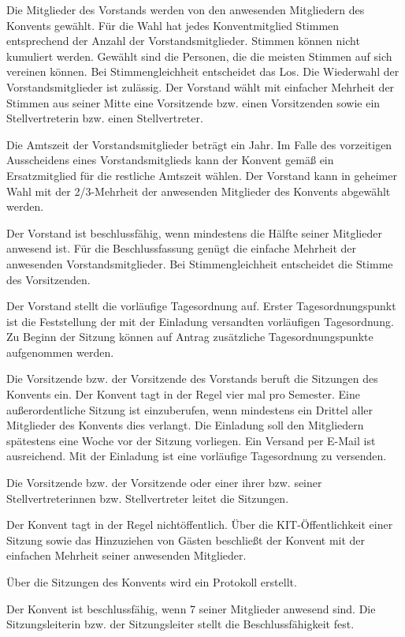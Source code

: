 \documentclass[a4paper, parskip=half, numbers=noenddot]{scrartcl}
\begin{document}
\begin{contract}
\label{wahl}
Die Mitglieder des Vorstands werden von den anwesenden Mitgliedern des Konvents gewählt. Für
die Wahl hat jedes Konventmitglied Stimmen entsprechend der Anzahl der Vorstandsmitglieder. Stimmen können nicht kumuliert werden.
Gewählt sind die Personen, die die meisten Stimmen auf sich vereinen können. Bei Stimmengleichheit entscheidet das Los. Die Wiederwahl der Vorstandsmitglieder ist zulässig.
Der Vorstand wählt mit einfacher Mehrheit der Stimmen aus seiner Mitte eine Vorsitzende bzw.
einen Vorsitzenden sowie ein Stellvertreterin bzw. einen Stellvertreter.

Die Amtszeit der Vorstandsmitglieder beträgt ein Jahr. Im Falle des vorzeitigen Ausscheidens
eines Vorstandsmitglieds kann der Konvent gemäß  ein Ersatzmitglied für die restliche Amtszeit wählen. Der Vorstand kann in geheimer Wahl mit der 2/3-Mehrheit der anwesenden Mitglieder des Konvents abgewählt werden.

Der Vorstand ist beschlussfähig, wenn mindestens die Hälfte seiner Mitglieder anwesend ist. Für die Beschlussfassung genügt die einfache Mehrheit der anwesenden Vorstandsmitglieder. Bei Stimmengleichheit entscheidet die Stimme des Vorsitzenden.


Der Vorstand stellt die vorläufige Tagesordnung auf. Erster Tagesordnungspunkt ist die Feststellung der mit der Einladung versandten vorläufigen Tagesordnung. Zu Beginn der Sitzung können auf Antrag zusätzliche Tagesordnungspunkte aufgenommen werden.

Die Vorsitzende bzw. der Vorsitzende des Vorstands beruft die Sitzungen des Konvents ein.
Der Konvent tagt in der Regel vier mal pro Semester. Eine außerordentliche Sitzung ist einzuberufen, wenn mindestens ein Drittel aller Mitglieder des Konvents dies verlangt. Die Einladung soll den Mitgliedern spätestens eine Woche vor der Sitzung vorliegen. Ein Versand per E-Mail ist ausreichend. Mit der Einladung ist eine vorläufige Tagesordnung zu versenden.

Die Vorsitzende bzw. der Vorsitzende oder einer ihrer bzw. seiner Stellvertreterinnen bzw. Stellvertreter leitet die Sitzungen.	

Der Konvent tagt in der Regel nichtöffentlich. Über die KIT-Öffentlichkeit einer Sitzung sowie das Hinzuziehen von Gästen beschließt der Konvent mit der einfachen Mehrheit seiner anwesenden Mitglieder.

Über die Sitzungen des Konvents wird ein Protokoll erstellt.

Der Konvent ist beschlussfähig, wenn 7 seiner Mitglieder anwesend sind. Die Sitzungsleiterin bzw. der Sitzungsleiter stellt die Beschlussfähigkeit fest.	


\end{contract}
\end{document}
